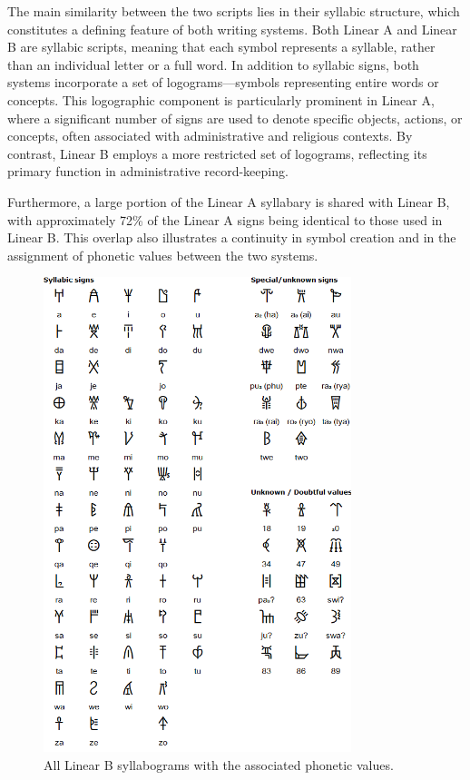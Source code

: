 The main similarity between the two scripts lies in their syllabic structure, which constitutes a defining feature of both writing systems.
Both Linear A and Linear B are syllabic scripts, meaning that each symbol represents a syllable, rather than an individual letter or a full word.
In addition to syllabic signs, both systems incorporate a set of logograms—symbols representing entire words or concepts.
This logographic component is particularly prominent in Linear A, where a significant number of signs are used to denote specific objects, actions, or concepts, often associated with administrative and religious contexts.
By contrast, Linear B employs a more restricted set of logograms, reflecting its primary function in administrative record-keeping.

Furthermore, a large portion of the Linear A syllabary is shared with Linear B, with approximately 72\% of the Linear A signs being identical to those used in Linear B.
This overlap also illustrates a continuity in symbol creation and in the assignment of phonetic values between the two systems.


\begin{figure}[H]
    \centering
    \includegraphics[width=0.8\textwidth]{Images/syll_LB.png} %
    \caption{All Linear B syllabograms with the associated phonetic values.}
    \label{fig:syll_LB}
\end{figure}

